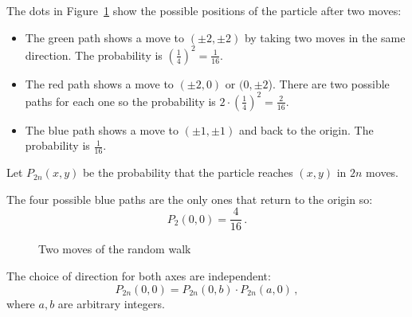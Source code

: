 \solution{}

The dots in Figure~\ref{f.two-moves} show the possible positions of the particle after two moves:
\begin{itemize}
\item The green path shows a move to $(\pm 2, \pm 2)$ by taking two moves in the same direction. The probability is $\left(\frac{1}{4}\right)^2= \frac{1}{16}$.
\item The red path shows a move to $(\pm 2,0)$ or $(0,\pm 2$). There are two possible paths for each one so the probability is $2\cdot\left(\frac{1}{4}\right)^2= \frac{2}{16}$.
\item The blue path shows a move to $(\pm 1,\pm 1)$ and back to the origin. The probability is $\frac{1}{16}$.
\end{itemize}
Let $P_{2n}(x,y)$ be the probability that the particle reaches $(x,y)$ in $2n$ moves.

The four possible blue paths are the only ones that return to the origin so:
\[
P_{2}(0,0)=\frac{4}{16}\,.
\]

\begin{figure}[tb]
\begin{center}
\end{center}
\caption{Two moves of the random walk}\label{f.two-moves}
\end{figure}

 The choice of direction for both axes are independent:
\begin{equation}\label{eq.2d-1}
P_{2n}(0,0) =
P_{2n}(0,b)\cdot P_{2n}(a,0)\,,
\end{equation}
where $a,b$ are arbitrary integers.


